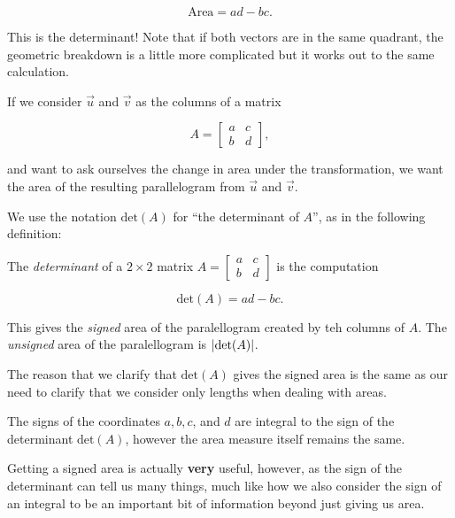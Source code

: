 \documentclass{ximera}
\begin{document}
\begin{example}
\begin{explanation}
      $$\text{Area}=ad-bc.$$

      This is the determinant! Note that if both vectors are in the same quadrant, the geometric breakdown is a little more complicated but it works out to the same calculation.
      
      If we consider $\vec{u}$ and $\vec{v}$ as the columns of a matrix 

      $$A=\begin{bmatrix}
      a&c\\b&d
      \end{bmatrix},$$
      
      and want to ask ourselves the change in area under the transformation, we want the area of the resulting parallelogram from $\vec{u}$ and $\vec{v}$. 
  

      \end{explanation}
      \end{example}

      We use the notation $\mbox{det}(A)$ for ``the determinant of $A$'', as in the following definition:

      \begin{definition}
        The \emph{determinant} of a $2\times 2$ matrix $A=\begin{bmatrix}
          a&c\\b&d
        \end{bmatrix}$ is the computation 

        $$\mbox{det}(A)=ad-bc.$$

        This gives the \emph{signed} area of the paralellogram created by teh columns of $A$. The \emph{unsigned} area of the paralellogram is $\left|\mbox{det}(A)\right|$.
      \end{definition}

      \begin{remark}
        The reason that we clarify that $\mbox{det}(A)$ gives the signed area is the same as our need to clarify that we consider only lengths when dealing with areas. 

        The signs of the coordinates $a, b, c$, and $d$ are integral to the sign of the determinant $\mbox{det}(A)$, however the area measure itself remains the same.

        Getting a signed area is actually {\bf very} useful, however, as the sign of the determinant can tell us many things, much like how we also consider the sign of an integral to be an important bit of information beyond just giving us area.
      \end{remark}
        
\end{document}
